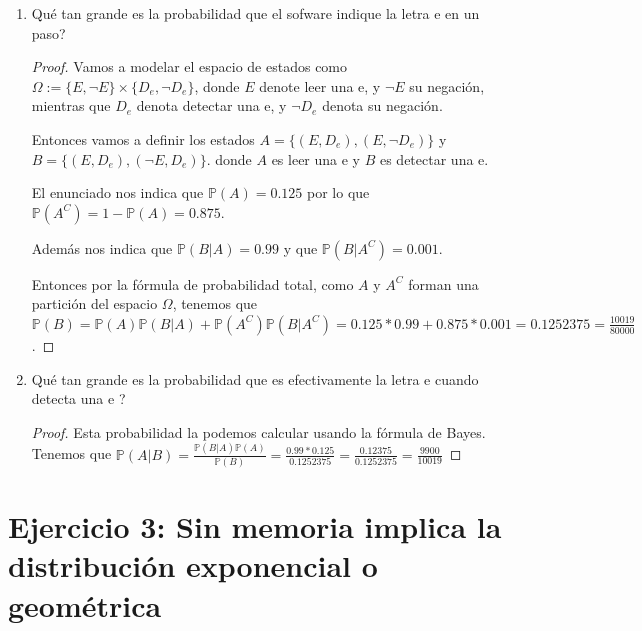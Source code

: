 \documentclass[paper=letter, fontsize=11pt]{scrartcl} %
\numberwithin{equation}{section} %
\numberwithin{figure}{section} %
\numberwithin{table}{section} %
\newcommand{\prob}[1]{\mathbb{P}(#1)}
\begin{document}
\begin{enumerate}[label = \arabic*.]
\item Qué tan grande es la probabilidad que el sofware indique la letra  e  en un paso?

\begin{proof}
Vamos a modelar el espacio de estados como $ \Omega:=\{E,\neg E\}\times \{D_e, \neg D_e\} $, donde $ E $ denote leer una e, y $ \neg E $ su negación, mientras que $ D_e $ denota detectar una e, y $ \neg D_e $ denota su negación.

Entonces vamos a definir los estados $ A = \{(E,D_e),(E,\neg D_e)\} $ y $ B=\{(E,D_e),(\neg E,D_e)\} $. donde $ A $ es leer una e y $ B $ es detectar una e.

El enunciado nos indica que $ \mathbb{P}(A)=0.125 $ por lo que $ \mathbb{P}(A^C)=1-\mathbb{P}(A)=0.875 $.

Además nos indica que $ \mathbb{P}(B|A) = 0.99 $ y que $ \mathbb{P}(B|A^C)=0.001 $.

Entonces por la fórmula de probabilidad total, como $ A $ y $ A^C $ forman una partición del espacio $ \Omega $, tenemos que $ \displaystyle \mathbb{P}(B)=\prob{A}\mathbb{P}(B|A)+\prob{A^C}\prob{B|A^C} = 0.125*0.99+0.875*0.001 = 0.1252375 = \frac{10019}{80000}
 $.
\end{proof}

\item Qué tan grande es la probabilidad que es efectivamente la letra  e  cuando detecta una  e ?

\begin{proof}
Esta probabilidad la podemos calcular usando la fórmula de Bayes. Tenemos que $ \displaystyle \prob{A|B} = \frac{\prob{B|A}\prob{A}}{\prob{B}} = \frac{0.99*0.125}{0.1252375} = \frac{0.12375}{0.1252375}= \frac{9900}{10019}$
\end{proof}
\end{enumerate}

\section{Ejercicio 3: Sin memoria implica la distribución exponencial o geométrica}
\end{document}
